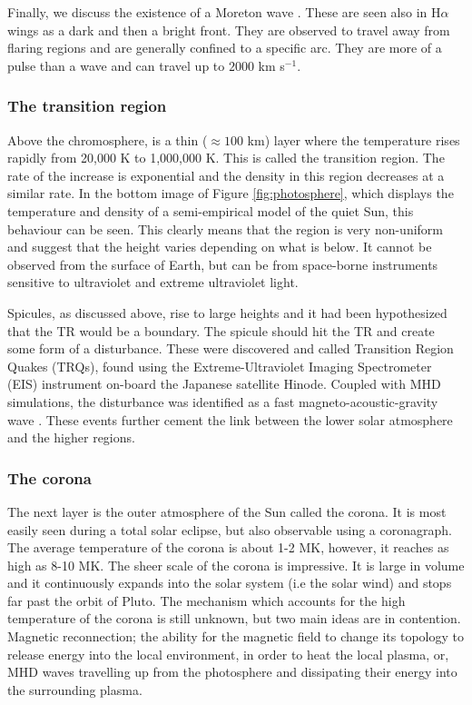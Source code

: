     Finally, we discuss the existence of a Moreton wave \citep{1960AJ.....65U.494M}.
    These are seen also in H$\alpha$ wings as a dark and then a bright front.
    They are observed to travel away from flaring regions and are generally confined to a specific arc.
    They are more of a pulse than a wave and can travel up to $2000$ km s$^{-1}$.
            
\subsubsection{The transition region}

    Above the chromosphere, is a thin ($\approx100$ km) layer where the temperature rises rapidly from 20,000 K to 1,000,000 K.
    This is called the transition region.
    The rate of the increase is exponential and the density in this region decreases at a similar rate.
    In the bottom image of Figure \ref{fig:photosphere}, which displays the temperature and density of a semi-empirical model of the quiet Sun, this behaviour can be seen.
    This clearly means that the region is very non-uniform and \citep{tian2009solar} suggest that the height varies depending on what is below.
    It cannot be observed from the surface of Earth, but can be from space-borne instruments sensitive to ultraviolet and extreme ultraviolet light.
    
    Spicules, as discussed above, rise to large heights and it had been hypothesized that the TR would be a boundary.
    The spicule should hit the TR and create some form of a disturbance.
    These were discovered and called Transition Region Quakes (TRQs), found using the Extreme-Ultraviolet Imaging Spectrometer (EIS) instrument on-board the Japanese satellite Hinode.
    Coupled with MHD simulations, the disturbance was identified as a fast magneto-acoustic-gravity wave \citep{0004-637X-743-1-14}.
    These events further cement the link between the lower solar atmosphere and the higher regions.
    
\subsubsection{The corona}
\label{corona}

    The next layer is the outer atmosphere of the Sun called the corona.
    It is most easily seen during a total solar eclipse, but also observable using a coronagraph.
    The average temperature of the corona is about 1-2 MK, however, it reaches as high as 8-10 MK.
    The sheer scale of the corona is impressive.
    It is large in volume and it continuously expands into the solar system (i.e the solar wind) and stops far past the orbit of Pluto.
    The mechanism which accounts for the high temperature of the corona is still unknown, but two main ideas are in contention.
    Magnetic reconnection; the ability for the magnetic field to change its topology to release energy into the local environment, in order to heat the local plasma, or, MHD waves travelling up from the photosphere and dissipating their energy into the surrounding plasma.
    

